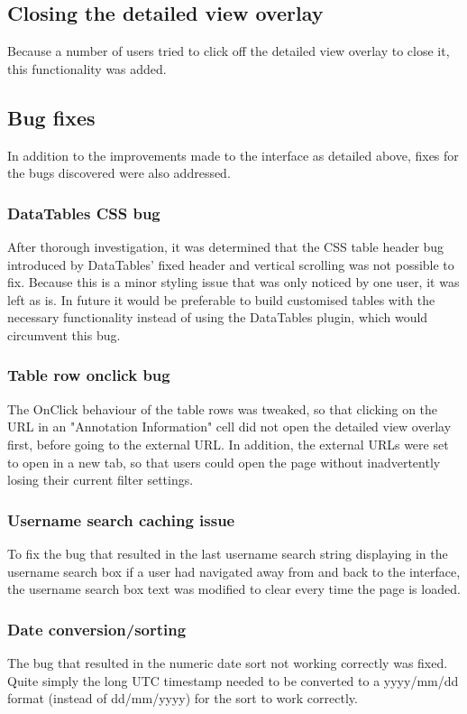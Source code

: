 \subsection{Closing the detailed view overlay}
Because a number of users tried to click off the detailed view overlay to close it, this functionality was added. 

\subsection{Bug fixes}
In addition to the improvements made to the interface as detailed above, fixes for the bugs discovered were also addressed. 

\subsubsection{DataTables CSS bug}
After thorough investigation, it was determined that the CSS table header bug introduced by DataTables' fixed header and vertical scrolling was not possible to fix. Because this is a minor styling issue that was only noticed by one user, it was left as is. In future it would be preferable to build customised tables with the necessary functionality instead of using the DataTables plugin, which would circumvent this bug.

\subsubsection{Table row onclick bug}
The OnClick behaviour of the table rows was tweaked, so that clicking on the URL in an "Annotation Information" cell did not open the detailed view overlay first, before going to the external URL. In addition, the external URLs were set to open in a new tab, so that users could open the page without inadvertently losing their current filter settings. 

\subsubsection{Username search caching issue}
To fix the bug that resulted in the last username search string displaying in the username search box if a user had navigated away from and back to the interface, the username search box text was modified to clear every time the page is loaded. 

\subsubsection{Date conversion/sorting}
The bug that resulted in the numeric date sort not working correctly was fixed. Quite simply the long UTC timestamp needed to be converted to a yyyy/mm/dd format (instead of dd/mm/yyyy) for the sort to work correctly. 

